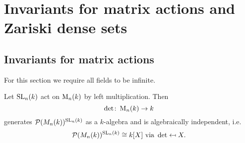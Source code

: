 \chapter{Invariants for matrix actions and Zariski dense sets}





\section{Invariants for matrix actions}
For this section we require all fields to be infinite.


\begin{thrm}
  Let $\operatorname{SL}_n(k)$ act on $\operatorname{M}_n(k)$ by left multiplication. Then
  \[
    \det \colon \operatorname{M}_n(k) \to k
  \]
  generates $\mathcal{P}(M_n(k))^{\operatorname{SL}_n(k)}$ as a $k$-algebra and is algebraically independent, i.e.\
  \[
    \mathcal{P}(M_n(k))^{\operatorname{SL}_n(k)} \cong k[X] \text{ via } \det \mapsfrom X.
  \]
\end{thrm}
